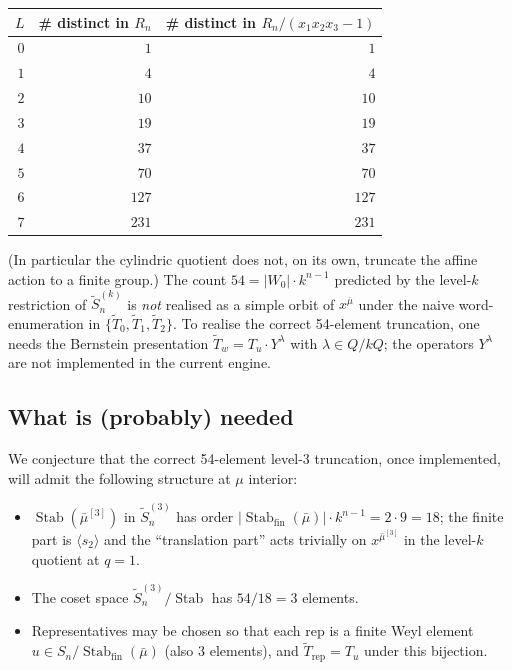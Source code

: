 \documentclass[11pt]{article}
\theoremstyle{definition}
\newcommand{\bmu}{\bar{\mu}}
\newcommand{\wt}[1]{\widetilde{#1}}
\newcommand{\Sn}{S_n}
\newcommand{\afSn}{\wt{S}_n}
\newcommand{\Stab}{\operatorname{Stab}}
\newcommand{\Rn}{R_n}
\begin{document}
\begin{center}
\begin{tabular}{|r|r|r|}
\hline
$L$ & \# distinct in $\Rn$ & \# distinct in $\Rn/(x_1x_2x_3-1)$ \\
\hline
$0$ & $1$   & $1$ \\
$1$ & $4$   & $4$ \\
$2$ & $10$  & $10$ \\
$3$ & $19$  & $19$ \\
$4$ & $37$  & $37$ \\
$5$ & $70$  & $70$ \\
$6$ & $127$ & $127$ \\
$7$ & $231$ & $231$ \\
\hline
\end{tabular}
\end{center}

(In particular the cylindric quotient does not, on its own, truncate the
affine action to a finite group.) The count $54 = |W_0| \cdot k^{n-1}$
predicted by the level-$k$ restriction of $\afSn^{(k)}$ is
\emph{not} realised as a simple orbit of $x^\bmu$ under the naive
word-enumeration in $\{\wt T_0, \wt T_1, \wt T_2\}$. To realise the correct
54-element truncation, one needs the Bernstein presentation
$\wt T_w = T_u \cdot Y^\lambda$ with $\lambda \in Q/kQ$; the operators
$Y^\lambda$ are not implemented in the current engine.

\subsection{What is (probably) needed}

We conjecture that the correct 54-element level-$3$ truncation, once
implemented, will admit the following structure at $\mu$ interior:

\begin{itemize}[nosep]
\item $\Stab(\bmu^{[3]})$ in $\afSn^{(3)}$ has order
  $|\Stab_\text{fin}(\bmu)| \cdot k^{n-1} = 2 \cdot 9 = 18$;
  the finite part is $\langle s_2 \rangle$ and the ``translation part''
  acts trivially on $x^{\bmu^{[3]}}$ in the level-$k$ quotient at $q=1$.
\item The coset space $\afSn^{(3)} / \Stab$ has $54 / 18 = 3$ elements.
\item Representatives may be chosen so that each rep is a finite Weyl
  element $u \in \Sn/\Stab_\text{fin}(\bmu)$ (also $3$ elements), and
  $\wt T_{\text{rep}} = T_u$ under this bijection.
\end{itemize}
\end{document}

